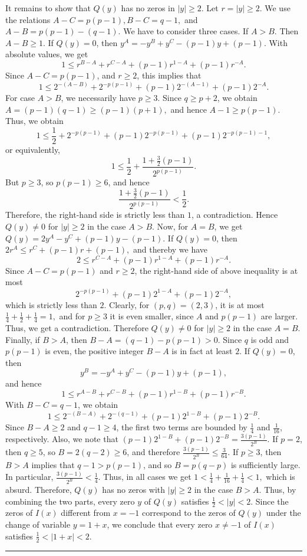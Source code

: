 \documentclass[12pt,twoside]{article}
\renewenvironment{proof}{{\noindent\bfseries Proof.}}{\qed}
\def\qed{\nolinebreak\hfill\rule{.2cm}{.2cm}\par\addvspace{.5cm}}
\begin{document}
\begin{proof}
	It remains to show that $Q(y)$ has no zeros in $|y|\geq 2$. Let $r=|y|\geq 2$. We use the relations
	$
	A-C=p(p-1), 
	B-C=q-1,
	$
	and
	$
	A-B=p(p-1)-(q-1).
	$
	We have to consider three cases. If $A>B$. Then $A-B\geq 1$. If $Q(y)=0$, then
	$
	y^A=-y^B+y^C-(p-1)y+(p-1).
	$
	With absolute values, we get
	$$
	1
	\leq
	r^{B-A}+r^{C-A}+(p-1)r^{1-A}+(p-1)r^{-A}.
	$$
	Since $A-C=p(p-1)$, and $r\geq 2$, this implies that
	$$
	1
	\leq
	2^{-(A-B)}
	+
	2^{-p(p-1)}
	+
	(p-1)2^{-(A-1)}
	+
	(p-1)2^{-A}.
	$$
	For case $A>B$, we necessarily have $p\geq 3$. Since $q\geq p+2$, we obtain
	$
	A=(p-1)(q-1)\geq (p-1)(p+1),
	$
	and hence $A-1\geq p(p-1)$. Thus, we obtain
	$$
	1
	\leq
	\frac12
	+
	2^{-p(p-1)}
	+
	(p-1)2^{-p(p-1)}
	+
	(p-1)2^{-p(p-1)-1},
	$$
	or equivalently,
	$$
	1
	\leq
	\frac12+
	\frac{1+\frac32(p-1)}{2^{p(p-1)}}.
	$$
	But $p\geq 3$, so $p(p-1)\geq 6$, and hence
	$$
	\frac{1+\frac32(p-1)}{2^{p(p-1)}}<\frac12.
	$$
	Therefore, the right-hand side is strictly less than $1$, a contradiction. Hence $Q(y)\neq 0$ for $|y|\geq 2$ in the case $A>B$.
	 Now, for $A=B$, we get 
	$
	Q(y)=2y^A-y^C+(p-1)y-(p-1).
	$
	If $Q(y)=0$, then
	$
	2r^A\leq r^C+(p-1)r+(p-1), 
	$ and thereby we have
	$$
	2\leq r^{C-A}+(p-1)r^{1-A}+(p-1)r^{-A}.
	$$
	Since $A-C=p(p-1)$ and $r\geq 2$, the right-hand side of above inequality  is at most
	$$
	2^{-p(p-1)}+(p-1)2^{1-A}+(p-1)2^{-A},
	$$
	which is strictly less than $2$. Clearly, for $(p,q)=(2,3)$, it is at most
	$
	\frac14+\frac12+\frac14=1,
	$
	and for $p\geq 3$ it is even smaller, since $A$ and $p(p-1)$ are larger. Thus, we get a contradiction. Therefore $Q(y)\neq 0$ for $|y|\geq 2$ in the case $A=B$. Finally, if $B>A$, then
	$
	B-A=(q-1)-p(p-1)>0.
	$
	Since $q$ is odd and $p(p-1)$ is even, the positive integer $B-A$ is in fact at least $2$. If $Q(y)=0$, then
	$$
	y^B=-y^A+y^C-(p-1)y+(p-1),
	$$
	and hence
	$$
	1
	\leq
	r^{A-B}+r^{C-B}+(p-1)r^{1-B}+(p-1)r^{-B}.
	$$
	With $B-C=q-1$, we obtain
	$$
	1
	\leq
	2^{-(B-A)}
	+
	2^{-(q-1)}
	+
	(p-1)2^{1-B}
	+
	(p-1)2^{-B}.
	$$
	Since $B-A\geq 2$ and $q-1\geq 4$, the first two terms are bounded by $\tfrac14$ and $\tfrac1{16}$, respectively. Also, we note that 
	$
	(p-1)2^{1-B}+(p-1)2^{-B}
	=
	\tfrac{3(p-1)}{2^B}.
	$
	If $p=2$, then $q\geq 5$, so $B=2(q-2)\geq 6$, and therefore
	$
	\tfrac{3(p-1)}{2^B}\leq \tfrac{3}{64}.
	$
	If $p\geq 3$, then $B>A$ implies that $q-1>p(p-1)$, and so $B=p(q-p)$ is sufficiently large. In particular,
	$
	\tfrac{3(p-1)}{2^B}<\tfrac14.
	$
	Thus,  in all cases we get
	$
	1
	<
	\tfrac14+\tfrac1{16}+\tfrac14
	<1,
	$
	which is absurd. Therefore, $Q(y)$ has no zeros with $|y|\geq 2$ in the case $B>A$.
	Thus, by combining the two parts, every zero $y$ of $Q(y)$ satisfies
	$
	\tfrac12<|y|<2.
	$
	Since the zeros of $I(x)$ different from $x=-1$ correspond to the zeros of $Q(y)$ under the change of variable $y=1+x$, we conclude that every zero $x\neq -1$ of $I(x)$ satisfies
	$
	\tfrac12<|1+x|<2.
	$
\end{proof} 
\end{document}
